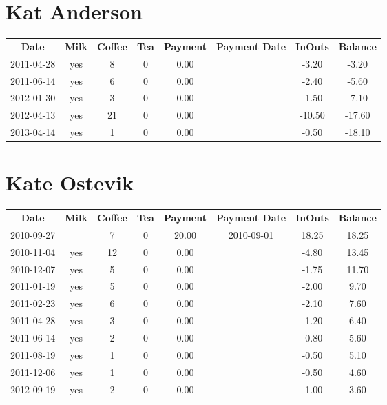 \section{Kat Anderson}

\begin{center}
\begin{tabular}{cccccccc}
\textbf{Date} & \textbf{Milk} & \textbf{Coffee} & \textbf{Tea} & \textbf{Payment} & \textbf{Payment Date} & \textbf{InOuts} & \textbf{Balance} \\
2011-04-28 & yes &  8 & 0 & 0.00 &  &  -3.20 &  -3.20\\ 
2011-06-14 & yes &  6 & 0 & 0.00 &  &  -2.40 &  -5.60\\ 
2012-01-30 & yes &  3 & 0 & 0.00 &  &  -1.50 &  -7.10\\ 
2012-04-13 & yes & 21 & 0 & 0.00 &  & -10.50 & -17.60\\ 
2013-04-14 & yes &  1 & 0 & 0.00 &  &  -0.50 & -18.10
\end{tabular}
\end{center}

\section{Kate Ostevik}

\begin{center}
\begin{tabular}{cccccccc}
\textbf{Date} & \textbf{Milk} & \textbf{Coffee} & \textbf{Tea} & \textbf{Payment} & \textbf{Payment Date} & \textbf{InOuts} & \textbf{Balance} \\
2010-09-27 &  &  7 & 0 & 20.00 & 2010-09-01 & 18.25 & 18.25\\ 
2010-11-04 & yes & 12 & 0 &  0.00 &  & -4.80 & 13.45\\ 
2010-12-07 & yes &  5 & 0 &  0.00 &  & -1.75 & 11.70\\ 
2011-01-19 & yes &  5 & 0 &  0.00 &  & -2.00 &  9.70\\ 
2011-02-23 & yes &  6 & 0 &  0.00 &  & -2.10 &  7.60\\ 
2011-04-28 & yes &  3 & 0 &  0.00 &  & -1.20 &  6.40\\ 
2011-06-14 & yes &  2 & 0 &  0.00 &  & -0.80 &  5.60\\ 
2011-08-19 & yes &  1 & 0 &  0.00 &  & -0.50 &  5.10\\ 
2011-12-06 & yes &  1 & 0 &  0.00 &  & -0.50 &  4.60\\ 
2012-09-19 & yes &  2 & 0 &  0.00 &  & -1.00 &  3.60
\end{tabular}
\end{center}

